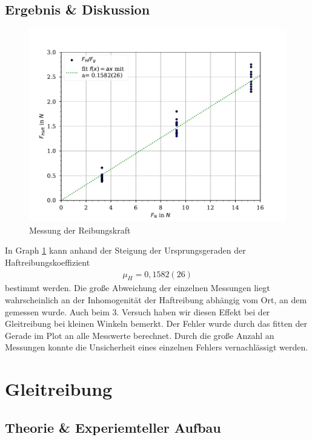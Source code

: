 \documentclass[11pt, a4paper]{article}
\begin{document}
    \subsection{Ergebnis \& Diskussion}
    \begin{figure}
        \centering
        \includegraphics[width=\textwidth]{./6Haftreibc.pdf}

        \caption{Messung der Reibungskraft}
        \label{fig:haftr}
    \end{figure}
    In Graph \ref{fig:haftr} kann anhand der Steigung der Ursprungsgeraden der Haftreibungskoeffizient
    \begin{align}
        \mu_H = 0,1582(26)
    \end{align} 
    bestimmt werden.
    Die große Abweichung der einzelnen Messungen liegt wahrscheinlich an der Inhomogenität der Haftreibung
    abhängig vom Ort, an dem gemessen wurde. Auch beim 3. Versuch haben wir diesen Effekt
    bei der Gleitreibung bei kleinen Winkeln bemerkt. Der Fehler wurde durch das fitten der Gerade im Plot 
    an alle Messwerte berechnet. Durch die große Anzahl an Messungen konnte die Unsicherheit eines einzelnen
    Fehlers vernachlässigt werden.

    \section{Gleitreibung}

    \subsection{Theorie \& Experiemteller Aufbau}
\end{document}
